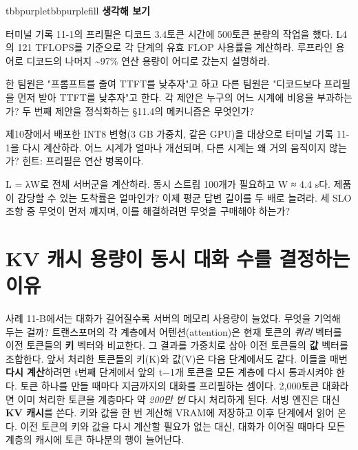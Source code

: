 \begin{calloutbox}{tbbpurple}{tbbpurplefill}
{\normalsize\bfseries\color{tbbpurple}생각해 보기}\par\vspace{3pt}
\begin{tbbitemize}
  \item 터미널 기록 11-1의 프리필은 디코드 3.4토큰 시간에 500토큰 분량의 작업을 했다. L4의 121 TFLOPS를 기준으로 각 단계의 유효 FLOP 사용률을 계산하라. 루프라인 용어로 디코드의 나머지 \textasciitilde{}97\% 연산 용량이 어디로 갔는지 설명하라.
  \item 한 팀원은 "프롬프트를 줄여 TTFT를 낮추자"고 하고 다른 팀원은 "디코드보다 프리필을 먼저 받아 TTFT를 낮추자"고 한다. 각 제안은 누구의 어느 시계에 비용을 부과하는가? 두 번째 제안을 정식화하는 §11.4의 메커니즘은 무엇인가?
  \item 제10장에서 배포한 INT8 변형(3 GB 가중치, 같은 GPU)을 대상으로 터미널 기록 11-1을 다시 계산하라. 어느 시계가 얼마나 개선되며, 다른 시계는 왜 거의 움직이지 않는가? 힌트: 프리필은 연산 병목이다.
  \item L = λW로 전체 서버군을 계산하라. 동시 스트림 100개가 필요하고 W ≈ 4.4 s다. 제품이 감당할 수 있는 도착률은 얼마인가? 이제 평균 답변 길이를 두 배로 늘려라. 세 SLO 조항 중 무엇이 먼저 깨지며, 이를 해결하려면 무엇을 구매해야 하는가?
\end{tbbitemize}
\end{calloutbox}

\section{KV 캐시 용량이 동시 대화 수를 결정하는 이유}

사례 11-B에서는 대화가 길어질수록 서버의 메모리 사용량이 늘었다. 무엇을 기억해 두는 걸까? 트랜스포머의 각 계층에서 어텐션(attention)은 현재 토큰의 \textit{쿼리} 벡터를 이전 토큰들의 \textbf{키} 벡터와 비교한다. 그 결과를 가중치로 삼아 이전 토큰들의 \textbf{값} 벡터를 조합한다. 앞서 처리한 토큰들의 키(K)와 값(V)은 다음 단계에서도 같다. 이들을 매번 \textbf{다시 계산}하려면 t번째 단계에서 앞의 t−1개 토큰을 모든 계층에 다시 통과시켜야 한다. 토큰 하나를 만들 때마다 지금까지의 대화를 프리필하는 셈이다. 2,000토큰 대화라면 이미 처리한 토큰을 계층마다 약 \textit{200만 번} 다시 처리하게 된다. 서빙 엔진은 대신 \textbf{KV 캐시}를 쓴다. 키와 값을 한 번 계산해 VRAM에 저장하고 이후 단계에서 읽어 온다. 이전 토큰의 키와 값을 다시 계산할 필요가 없는 대신, 대화가 이어질 때마다 모든 계층의 캐시에 토큰 하나분의 행이 늘어난다.

